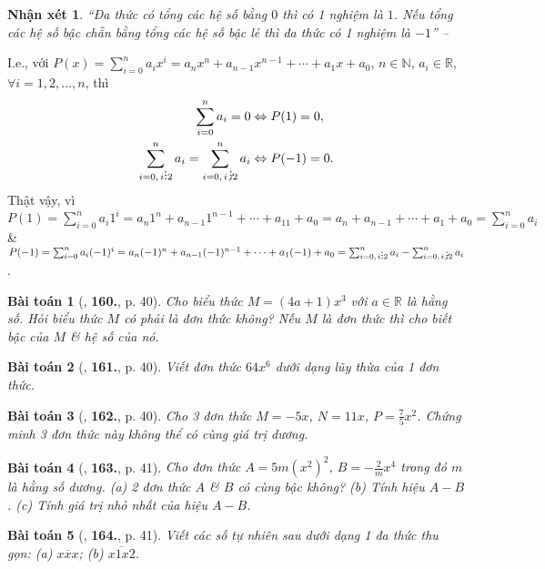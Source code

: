 \documentclass{article}
\numberwithin{equation}{section}
\newtheorem{baitoan}{Bài toán}
\newtheorem{nhanxet}{Nhận xét}[section]
\DeclareRobustCommand{\divby}{%
	\mathrel{\vbox{\baselineskip.65ex\lineskiplimit0pt\hbox{.}\hbox{.}\hbox{.}}}%
}
\begin{document}
\begin{nhanxet}
	``Đa thức có tổng các hệ số bằng $0$ thì có 1 nghiệm là $1$. Nếu tổng các hệ số bậc chẵn bằng tổng các hệ số bậc lẻ thì đa thức có 1 nghiệm là $-1$'' -- \cite[p. 40]{Tuyen_Toan_7}
\end{nhanxet}
I.e., với $P(x) = \sum_{i=0}^n a_ix^i = a_nx^n + a_{n-1}x^{n-1} + \cdots + a_1x + a_0$, $n\in\mathbb{N}$, $a_i\in\mathbb{R}$, $\forall i = 1,2,\ldots,n$, thì
\begin{align*}
	\sum_{i=0}^n a_i = 0&\Leftrightarrow P(1) = 0,\\
	\sum_{i=0,\,i\divby 2}^n a_i = \sum_{i=0,\,i\not\,\divby 2}^n a_i&\Leftrightarrow P(-1) = 0.
\end{align*}
Thật vậy, vì $P(1) = \sum_{i=0}^n a_i1^i = a_n1^n + a_{n-1}1^{n-1} + \cdots + a_11 + a_0 = a_n + a_{n-1} + \cdots + a_1 + a_0 = \sum_{i=0}^n a_i$ \& $P(-1) = \sum_{i=0}^n a_i(-1)^i = a_n(-1)^n + a_{n-1}(-1)^{n-1} + \cdots + a_1(-1) + a_0 = \sum_{i=0,\,i\divby 2}^n a_i - \sum_{i=0,\,i\not\,\divby 2}^n a_i$.

\begin{baitoan}[\cite{Tuyen_Toan_7}, \textbf{160.}, p. 40]
	Cho biểu thức $M = (4a + 1)x^3$ với $a\in\mathbb{R}$ là hằng số. Hỏi biểu thức $M$ có phải là đơn thức không? Nếu $M$ là đơn thức thì cho biết bậc của $M$ \& hệ số của nó.
\end{baitoan}

\begin{baitoan}[\cite{Tuyen_Toan_7}, \textbf{161.}, p. 40]
	Viết đơn thức $64x^6$ dưới dạng lũy thừa của 1 đơn thức.
\end{baitoan}

\begin{baitoan}[\cite{Tuyen_Toan_7}, \textbf{162.}, p. 40]
	Cho 3 đơn thức $M = -5x$, $N = 11x$, $P = \frac{7}{5}x^2$. Chứng minh 3 đơn thức này không thể có cùng giá trị dương.
\end{baitoan}

\begin{baitoan}[\cite{Tuyen_Toan_7}, \textbf{163.}, p. 41]
	Cho đơn thức $A = 5m(x^2)^2$, $B = -\frac{2}{m}x^4$ trong đó $m$ là hằng số dương. (a) 2 đơn thức $A$ \& $B$ có cùng bậc không? (b) Tính hiệu $A - B$. (c) Tính giá trị nhỏ nhất của hiệu $A - B$.
\end{baitoan}

\begin{baitoan}[\cite{Tuyen_Toan_7}, \textbf{164.}, p. 41]
	Viết các số tự nhiên sau dưới dạng 1 đa thức thu gọn: (a) $\overline{xxx}$; (b) $\overline{x1x2}$.
\end{baitoan}
\end{document}
